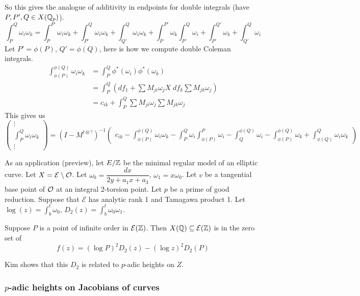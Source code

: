 So this gives the analogue of additivity in endpoints for double integrals (have $P,P',Q \in X(\mathbb{Q}_p)$).
	\[
	\int_P^Q \omega_i \omega_k= \int_P^{P'} \omega_i \omega_k + \int_{P'}^Q \omega_i \omega_k + \int_{Q'}^Q \omega_i \omega_k + \int_P^{P'} \omega_k \int_{P'}^Q \omega_i + \int_{P'}^{Q'} \omega_k + \int_{Q'}^Q \omega_i
	\]
Let $P'= \phi(P)$, $Q'= \phi(Q)$, here is how we compute double Coleman integrals. 
	\[
	\begin{aligned}
	\int_{\phi(P)}^{\phi(Q)} \omega_i \omega_k&= \int_P^Q \phi^*(\omega_i) \phi^*(\omega_k) \\
	&= \int_P^Q (df_1 + \sum M_{ji} \omega_j X \;df_k  \sum M_{jk} \omega_j ) \\
	&= c_{ik} + \int_P^Q \sum M_{ji} \omega_j \sum M_{jk} \omega_j
	\end{aligned}
	\]
This gives us
	\[
	\begin{pmatrix}
	\vdots \\
	\int_P^Q \omega_i \omega_k \\
	\vdots
	\end{pmatrix}=
	(I-M^{t \otimes ?})^{-1}
	\begin{pmatrix}
	c_{ik} - \int_{\phi(P)}^{\phi(Q)} \omega_i \omega_k - \int_P^Q \omega_i \int_{\phi(P)}^P \omega_i - \int_Q^{\phi(Q)} \omega_i - \int_{\phi(P)}^{\phi(Q)} \omega_k + \int_{\phi(Q)}^Q \omega_i \omega_k
	\end{pmatrix}
	\]


As an application (preview), let $E/\mathbb{Z}$ be the minimal regular model of an elliptic curve. Let $X= \mathcal{E} \setminus \mathcal{O}$. Let $\omega_0= \dfrac{dx}{2y+a_1x+a_3}$, $\omega_1= x\omega_0$. Let $v$ be a tangential base point of $\mathcal{O}$ at an integral 2-torsion point. Let $p$ be a prime of good reduction. Suppose that $\mathcal{E}$ has analytic rank 1 and Tamagawa product 1. Let $\log(z)= \int_b^t \omega_0$, $D_2(z)= \int_b^t \omega_0 \omega_1$.


\begin{thm}
Suppose $P$ is a point of infinite order in $\mathcal{E}(\mathbb{Z})$. Then $X(\mathbb{Q}) \subseteq \mathcal{E}(\mathbb{Z})$ is in the zero set of
	\[
	f(z)= (\log P)^2 D_2(z) - (\log z)^2 D_2(P)
	\]
\end{thm}


Kim shows that this $D_2$ is related to $p$-adic heights on $Z$.



\subsubsection{$p$-adic heights on Jacobians of curves}


